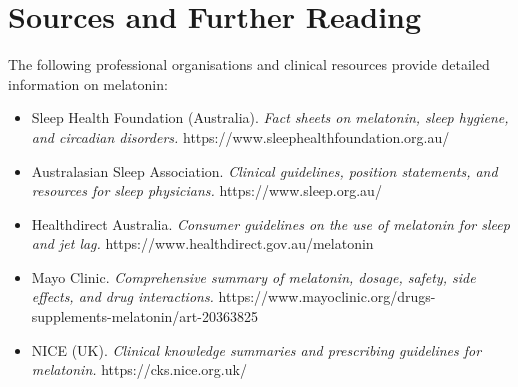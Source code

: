 \section*{Sources and Further Reading}
The following professional organisations and clinical resources provide detailed information on melatonin:
\begin{itemize}
    \item Sleep Health Foundation (Australia). \textit{Fact sheets on melatonin, sleep hygiene, and circadian disorders.} https://www.sleephealthfoundation.org.au/
    \item Australasian Sleep Association. \textit{Clinical guidelines, position statements, and resources for sleep physicians.} https://www.sleep.org.au/
    \item Healthdirect Australia. \textit{Consumer guidelines on the use of melatonin for sleep and jet lag.} https://www.healthdirect.gov.au/melatonin
    \item Mayo Clinic. \textit{Comprehensive summary of melatonin, dosage, safety, side effects, and drug interactions.} https://www.mayoclinic.org/drugs-supplements-melatonin/art-20363825
    \item NICE (UK). \textit{Clinical knowledge summaries and prescribing guidelines for melatonin.} https://cks.nice.org.uk/
\end{itemize}
